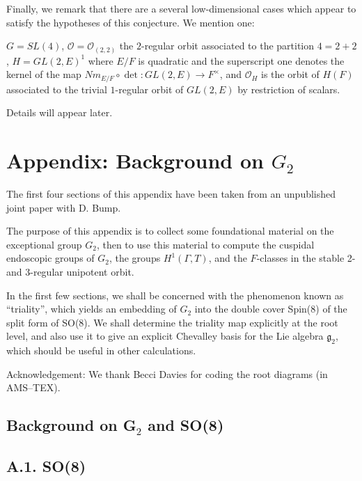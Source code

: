 \documentclass[12pt,letterpaper]{amsart}
\begin{document}
Finally, we remark that there are a several low-dimensional cases which
appear to
satisfy the hypotheses of this conjecture. We mention one:

$G=SL(4)$, ${\mathcal O}={\mathcal O}_{(2,2)}$ the $2$-regular orbit associated
to the partition $4=2+2$, $H=GL(2,E)^1$ where $E/F$ is quadratic
and the superscript one denotes the kernel of the map
$Nm_{E/F}\circ \det :GL(2,E)\rightarrow F^{\times}$, and
${\mathcal O}_H$ is the orbit of $H(F)$ associated to the
trivial $1$-regular orbit of $GL(2,E)$ by restriction of scalars.

Details will appear later.
\fi
\section*{Appendix: Background on $G_2$}

The first four sections of this appendix have been taken from an
unpublished joint paper with D. Bump.

The purpose of this appendix is to collect some foundational material on
the exceptional group $G_2$, then to use this material to
compute the cuspidal endoscopic groups of
$G_2$, the groups $H^1(\Gamma, T)$, and the $F$-classes in the
stable 2- and 3-regular unipotent orbit.

In the first few sections, we shall be concerned with the phenomenon
known as ``triality'',
which yields an embedding of $G_2$ into the double cover Spin(8) of
the split form of SO(8). We shall
determine the triality map explicitly at the root level, and also use it to
give an explicit Chevalley basis for the Lie algebra ${\mathfrak g}_2$,
which should be useful in other calculations.

\noindent
Acknowledgement: We thank Becci Davies for coding the root diagrams
(in AMS--TEX).

\subsection*{Background on G$_2$ and SO(8)}

\subsection*{A.1. SO(8)}
\end{document}
